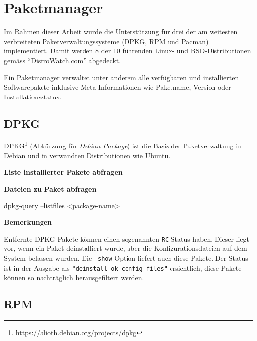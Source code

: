 

\section{Paketmanager}
\label{swidgenerator:paketmanager}

Im Rahmen dieser Arbeit wurde die Unterstützung für drei der am weitesten
verbreiteten Paketverwaltungssysteme (DPKG, RPM und Pacman) implementiert. Damit
werden 8 der 10 führenden Linux- und BSD-Distributionen gemäss
\enquote{DistroWatch.com}\cite{distrowatch:2014} abgedeckt.

Ein Paketmanager verwaltet unter anderem alle verfügbaren und installierten
Softwarepakete inklusive Meta-Informationen wie Paketname, Version oder
Installationsstatus.

\subsection{DPKG}

DPKG\footnote{\url{https://alioth.debian.org/projects/dpkg}} (Abkürzung für
\textit{Debian Package}) ist die Basis der Paketverwaltung in Debian und in
verwandten Distributionen wie Ubuntu.

\textbf{Liste installierter Pakete abfragen}


\textbf{Dateien zu Paket abfragen}

\begin{bashcode}
dpkg-query --listfiles <package-name>
\end{bashcode}

\textbf{Bemerkungen}

Entfernte DPKG Pakete können einen sogenannten \texttt{RC} Status haben. Dieser liegt
vor, wenn ein Paket deinstalliert wurde, aber die Konfigurationsdateien auf dem
System belassen wurden. Die \texttt{---show} Option liefert auch diese Pakete.
Der Status ist in der Ausgabe als \texttt{"deinstall ok config-files"}
ersichtlich, diese Pakete können so nachträglich herausgefiltert werden.


\subsection{RPM}

